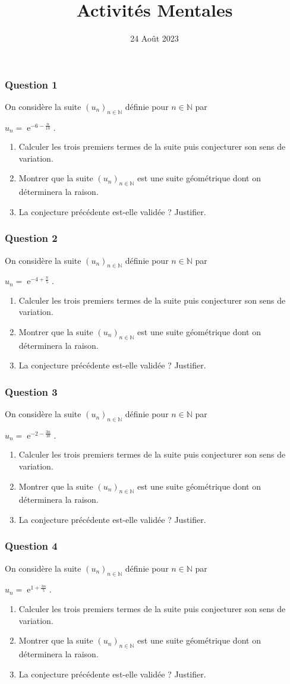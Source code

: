 \documentclass[15pt, mathserif]{beamer}
\title{Activités Mentales}
\date{24 Août 2023}
\DeclareMathOperator{\e}{e}
\newcommand{\N}{\mathbb{N}}			%
\newcommand{\st}[1]{$(#1_n)_{n \in \N}$}
\begin{document}
\begin{frame}
    \titlepage
\end{frame}

\begin{frame} 
	\frametitle{Question 1}
On considère la suite \st{u} définie pour $n \in \N$ par 
 
 \hfil$u_n=\e^{-6-\frac{n}{10}}.$
 \begin{enumerate} 
 	 \item Calculer les trois premiers termes de la suite puis conjecturer son sens de variation. 
 	 \item Montrer que la suite \st{u} est une suite géométrique dont on déterminera la raison. 
 	 \item La conjecture précédente est-elle validée ? Justifier. 
 \end{enumerate}\end{frame}


\begin{frame} 
	\frametitle{Question 2}
On considère la suite \st{u} définie pour $n \in \N$ par 
 
 \hfil$u_n=\e^{-4+\frac{n}{5}}.$
 \begin{enumerate} 
 	 \item Calculer les trois premiers termes de la suite puis conjecturer son sens de variation. 
 	 \item Montrer que la suite \st{u} est une suite géométrique dont on déterminera la raison. 
 	 \item La conjecture précédente est-elle validée ? Justifier. 
 \end{enumerate}\end{frame}


\begin{frame} 
	\frametitle{Question 3}
On considère la suite \st{u} définie pour $n \in \N$ par 
 
 \hfil$u_n=\e^{-2-\frac{3n}{10}}.$
 \begin{enumerate} 
 	 \item Calculer les trois premiers termes de la suite puis conjecturer son sens de variation. 
 	 \item Montrer que la suite \st{u} est une suite géométrique dont on déterminera la raison. 
 	 \item La conjecture précédente est-elle validée ? Justifier. 
 \end{enumerate}\end{frame}


\begin{frame} 
	\frametitle{Question 4}
On considère la suite \st{u} définie pour $n \in \N$ par 
 
 \hfil$u_n=\e^{1+\frac{3n}{5}}.$
 \begin{enumerate} 
 	 \item Calculer les trois premiers termes de la suite puis conjecturer son sens de variation. 
 	 \item Montrer que la suite \st{u} est une suite géométrique dont on déterminera la raison. 
 	 \item La conjecture précédente est-elle validée ? Justifier. 
 \end{enumerate}\end{frame}
\end{document}
